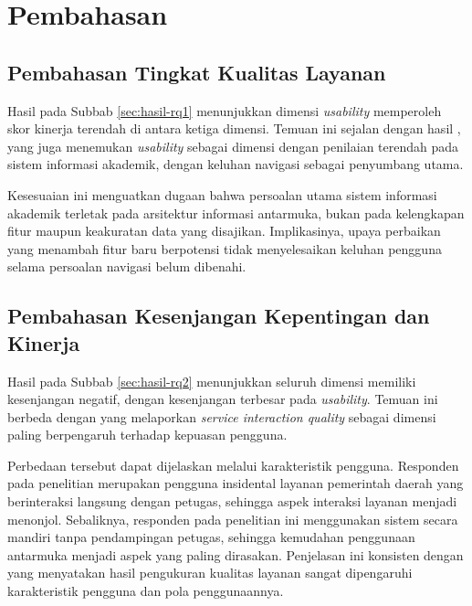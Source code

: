 \section{Pembahasan}

\subsection{Pembahasan Tingkat Kualitas Layanan}

Hasil pada Subbab \ref{sec:hasil-rq1} menunjukkan dimensi \textit{usability}
memperoleh skor kinerja terendah di antara ketiga dimensi. Temuan ini sejalan
dengan hasil \citet{wijaya2022}, yang juga menemukan \textit{usability} sebagai
dimensi dengan penilaian terendah pada sistem informasi akademik, dengan
keluhan navigasi sebagai penyumbang utama.

Kesesuaian ini menguatkan dugaan bahwa persoalan utama sistem informasi
akademik terletak pada arsitektur informasi antarmuka, bukan pada kelengkapan
fitur maupun keakuratan data yang disajikan. Implikasinya, upaya perbaikan yang
menambah fitur baru berpotensi tidak menyelesaikan keluhan pengguna selama
persoalan navigasi belum dibenahi.

\subsection{Pembahasan Kesenjangan Kepentingan dan Kinerja}

Hasil pada Subbab \ref{sec:hasil-rq2} menunjukkan seluruh dimensi memiliki
kesenjangan negatif, dengan kesenjangan terbesar pada \textit{usability}.
Temuan ini berbeda dengan \citet{pratama2023} yang melaporkan
\textit{service interaction quality} sebagai dimensi paling berpengaruh
terhadap kepuasan pengguna.

Perbedaan tersebut dapat dijelaskan melalui karakteristik pengguna. Responden
pada penelitian \citet{pratama2023} merupakan pengguna insidental layanan
pemerintah daerah yang berinteraksi langsung dengan petugas, sehingga aspek
interaksi layanan menjadi menonjol. Sebaliknya, responden pada penelitian ini
menggunakan sistem secara mandiri tanpa pendampingan petugas, sehingga
kemudahan penggunaan antarmuka menjadi aspek yang paling dirasakan. Penjelasan
ini konsisten dengan \citet{sari2024} yang menyatakan hasil pengukuran kualitas
layanan sangat dipengaruhi karakteristik pengguna dan pola penggunaannya.

